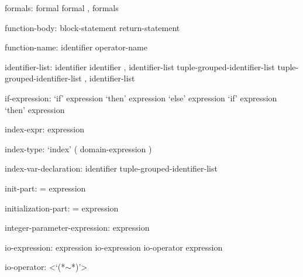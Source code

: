 \begin{syntax}
formals:
  formal
  formal , formals
\end{syntax}

\begin{syntax}
function-body:
  block-statement
  return-statement
\end{syntax}

\begin{syntax}
function-name:
  identifier
  operator-name
\end{syntax}

\begin{syntax}
identifier-list:
  identifier
  identifier , identifier-list
  tuple-grouped-identifier-list
  tuple-grouped-identifier-list , identifier-list
\end{syntax}

\begin{syntax}
if-expression:
  `if' expression `then' expression `else' expression
  `if' expression `then' expression
\end{syntax}

\begin{syntax}
index-expr:
  expression
\end{syntax}

\begin{syntax}
index-type:
  `index' ( domain-expression )
\end{syntax}

\begin{syntax}
index-var-declaration:
  identifier
  tuple-grouped-identifier-list
\end{syntax}

\begin{syntax}
init-part:
  = expression
\end{syntax}

\begin{syntax}
initialization-part:
  = expression
\end{syntax}

\begin{syntax}
integer-parameter-expression:
  expression
\end{syntax}

\begin{syntax}
io-expression:
  expression
  io-expression io-operator expression
\end{syntax}

\begin{syntax}
io-operator:
  <`(*$\sim$*)'>
\end{syntax}

